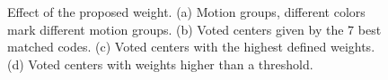 \begin{figure}
\centering
{}
\caption[Effect of the proposed weight]{Effect of the proposed weight. (a) Motion groups, different colors mark different motion groups. (b) Voted centers given by the 7 best matched codes. (c) Voted centers with the highest defined weights. (d) Voted centers with weights higher than a threshold.}
\label{fig:compa}
\end{figure}

